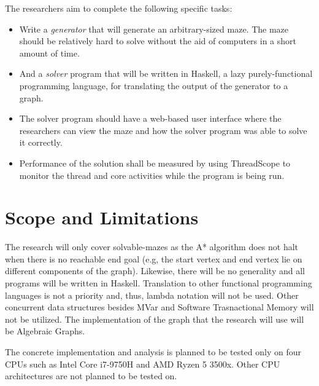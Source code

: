 The researchers aim to complete the following specific tasks:
\begin{itemize}
    \item Write a \emph{generator} that will generate an arbitrary-sized maze. The maze should be relatively 
        hard to solve without the aid of computers in a short amount of time.\cite{Buck2015}
    \item And a \emph{solver} program that will be written in Haskell, a lazy purely-functional programming language,
        for translating the output of the generator to a graph.\cite{HaskellSite}
    \item The solver program should have a web-based user interface where the researchers can view the maze and how 
        the solver program was able to solve it correctly.
    \item Performance of the solution shall be measured by using ThreadScope to monitor the thread and core activities 
        while the program is being run.\cite{ThreadScope}
\end{itemize}
\section{Scope and Limitations}

The research will only cover solvable-mazes as the A* algorithm does not halt when there is no reachable end goal (e.g,
the start vertex and end vertex lie on different components of the graph).\cite{HartNilssonRaphael1968} Likewise, there will be no generality
and all programs will be written in Haskell. Translation to other functional programming languages is not a priority and, thus,
lambda notation will not be used. Other concurrent data structures besides MVar and Software Trasnactional Memory will not be utilized. The 
implementation of the graph that the research will use will be Algebraic Graphs.\cite{Mokhov2017}

The concrete implementation and analysis is planned to be tested only on four CPUs such as Intel Core i7-9750H and AMD Ryzen 5 3500x.
Other CPU architectures are not planned to be tested on.